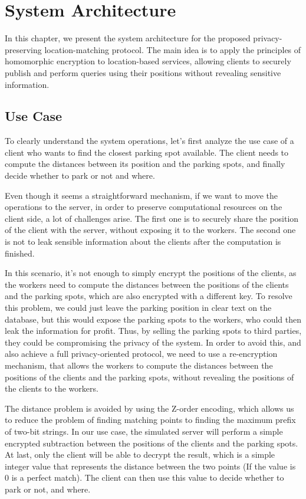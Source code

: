 \chapter{System Architecture} \label{chap:system-architecture}

In this chapter, we present the system architecture for the proposed privacy-preserving location-matching protocol. The main idea is to apply the principles of homomorphic encryption to location-based services, allowing clients to securely publish and perform queries using their positions without revealing sensitive information.

\section{Use Case}
To clearly understand the system operations, let's first analyze the use case of a client who wants to find the closest parking spot available. The client needs to compute the distances between its position and the parking spots, and finally decide whether to park or not and where.

Even though it seems a straightforward mechanism, if we want to move the operations to the server, in order to preserve computational resources on the client side, a lot of challenges arise. The first one is to securely share the position of the client with the server, without exposing it to the workers. The second one is not to leak sensible information about the clients after the computation is finished.

In this scenario, it's not enough to simply encrypt the positions of the clients, as the workers need to compute the distances between the positions of the clients and the parking spots, which are also encrypted with a different key. To resolve this problem, we could just leave the parking position in clear text on the database, but this would expose the parking spots to the workers, who could then leak the information for profit. Thus, by selling the parking spots to third parties, they could be compromising the privacy of the system. In order to avoid this, and also achieve a full privacy-oriented protocol, we need to use a re-encryption mechanism, that allows the workers to compute the distances between the positions of the clients and the parking spots, without revealing the positions of the clients to the workers.

The distance problem is avoided by using the Z-order encoding, which allows us to reduce the problem of finding matching points to finding the maximum prefix of two-bit strings. In our use case, the simulated server will perform a simple encrypted subtraction between the positions of the clients and the parking spots. At last, only the client will be able to decrypt the result, which is a simple integer value that represents the distance between the two points (If the value is 0 is a perfect match). The client can then use this value to decide whether to park or not, and where. 

